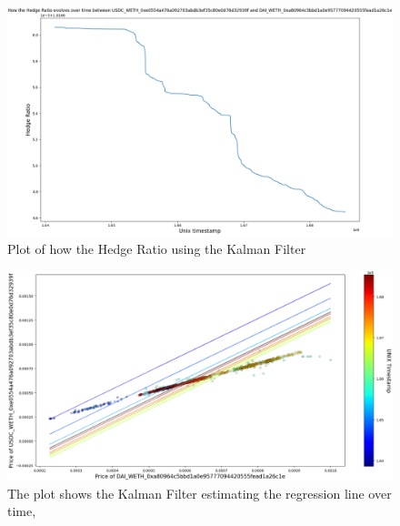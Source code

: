 \begin{figure}[!htb]
    \centering
    \includegraphics[width=\textwidth]{project/Images/Evolving_hedge_ratio_kf.png}
    \caption{Plot of how the Hedge Ratio using the Kalman Filter \label{fig:evolving_hedge_ratio_kf}}
\end{figure}

\begin{figure}[!htb]
    \centering
    \includegraphics[width=\textwidth]{project/Images/plots_1.png}
    \caption{The plot shows the Kalman Filter estimating the regression line over time, \label{fig:ratios_kf}}
\end{figure}

